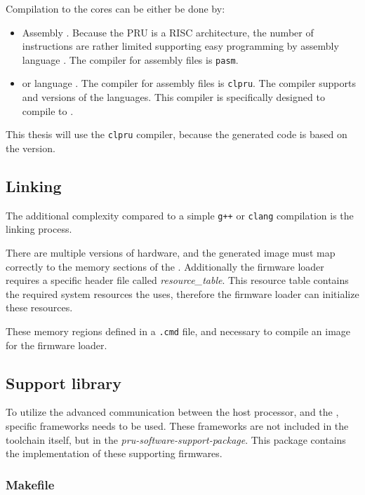 Compilation to the \pru cores can be either be done by:
\begin{itemize}
	\item Assembly \citep{PRU_ASM}. Because the PRU is a RISC architecture, the number of instructions are rather limited supporting easy programming by assembly language \citep{PRU_ASM_INSTR}. The compiler for assembly files is \verb+pasm+.
	\item \cpl{} or \cpp{} language \citep{PRU_C_CPP}. The compiler for assembly files is \verb+clpru+. The compiler supports  and  versions of the languages. This compiler is specifically designed to compile to \pru.
\end{itemize}
This thesis will use the \verb+clpru+ compiler, because the generated code is based on the  version.

\subsection{Linking}
\label{subs:linking}

The additional complexity compared to a simple \verb/g++/ or \verb/clang/ compilation is the linking process.

There are multiple versions of \pru hardware, and the generated image must map correctly to the memory sections of the \pru. Additionally the firmware loader requires a specific header file called \emph{resource\_table}. This resource table contains the required system resources the \pru uses, therefore the firmware loader can initialize these resources.

These memory regions defined in a \verb+.cmd+ file, and necessary to compile an \elf image for the firmware loader.

\subsection{Support library}

To utilize the advanced communication between the host processor, and the \pru, specific frameworks needs to be used. These frameworks are not included in the \pru \cpp{} toolchain itself, but in the \emph{pru-software-support-package}\citep{TI_PRUSS_REPO}. This package contains the implementation of these supporting firmwares.

\subsubsection{Makefile}

